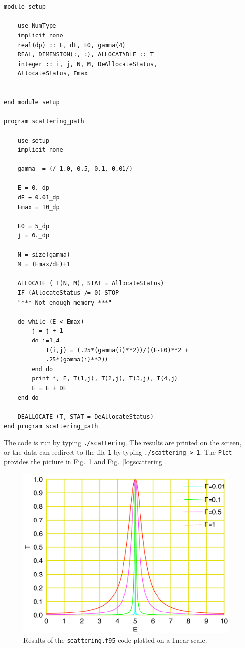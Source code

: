 \documentclass[12pt]{article}
\begin{document}
\begin{lstlisting}[frame=single,caption={The {\tt scattering.f95}},label=scattering95]


module setup

	use NumType
	implicit none
	real(dp) :: E, dE, E0, gamma(4)
	REAL, DIMENSION(:, :), ALLOCATABLE :: T
	integer :: i, j, N, M, DeAllocateStatus,
	AllocateStatus, Emax
	

end module setup

program scattering_path

	use setup
	implicit none
	
	gamma  = (/ 1.0, 0.5, 0.1, 0.01/) 

	E = 0._dp
	dE = 0.01_dp
	Emax = 10_dp

	E0 = 5_dp	
	j = 0._dp		

	N = size(gamma)
	M = (Emax/dE)+1

	ALLOCATE ( T(N, M), STAT = AllocateStatus)
	IF (AllocateStatus /= 0) STOP 
	"*** Not enough memory ***"
		
	do while (E < Emax)
		j = j + 1
		do i=1,4
			T(i,j) = (.25*(gamma(i)**2))/((E-E0)**2 + 
			.25*(gamma(i)**2))
		end do
		print *, E, T(1,j), T(2,j), T(3,j), T(4,j)
		E = E + DE
	end do 
		
	DEALLOCATE (T, STAT = DeAllocateStatus)
end program scattering_path

\end{lstlisting}


The code is run by typing {\tt ./scattering}. The results are printed on the screen, or the data can redirect to the file {\tt 1} by typing {\tt ./scattering > 1}. The {\tt Plot} provides the picture in Fig.\ \ref{linearscattering} and Fig.\ \ref{logscattering}. 


\begin{figure}[!htb]
\includegraphics[width=1.\textwidth]{linearplot.pdf}
\caption{Results of the {\tt scattering.f95} code plotted on a linear scale. }
\label{linearscattering}
\end{figure}
\end{document}
